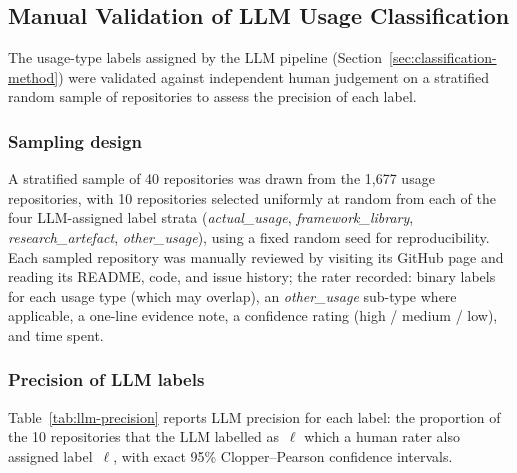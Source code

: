
\subsection{Manual Validation of LLM Usage Classification}
\label{sec:usage-validation}

The usage-type labels assigned by the LLM pipeline (Section~\ref{sec:classification-method})
were validated against independent human judgement on a stratified random sample of
repositories to assess the precision of each label.

\subsubsection*{Sampling design}
A stratified sample of 40 repositories was drawn from the 1{,}677 usage repositories,
with 10 repositories selected uniformly at random from each of the four LLM-assigned
label strata (\textit{actual\_usage}, \textit{framework\_library},
\textit{research\_artefact}, \textit{other\_usage}), using a fixed random seed for
reproducibility.
Each sampled repository was manually reviewed by visiting its GitHub page and reading
its README, code, and issue history; the rater recorded: binary labels for each
usage type (which may overlap), an \textit{other\_usage} sub-type where applicable,
a one-line evidence note, a confidence rating (high / medium / low), and time spent.

\subsubsection*{Precision of LLM labels}
Table~\ref{tab:llm-precision} reports LLM precision for each label: the proportion
of the 10 repositories that the LLM labelled as~$\ell$ which a human rater also
assigned label~$\ell$, with exact 95\% Clopper–Pearson confidence intervals.

